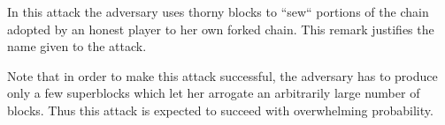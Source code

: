In this attack the adversary uses thorny blocks to ``sew`` portions of the chain adopted by an honest player to her own forked chain. This remark justifies the name given to the attack.

Note that in order to make this attack successful, the adversary has to produce only a few superblocks which let her arrogate an arbitrarily large number of blocks. Thus this attack is expected to succeed with overwhelming probability.

